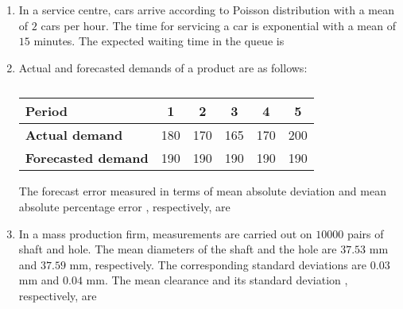 \documentclass[journal,12pt,onecolumn]{IEEEtran}
\theoremstyle{remark}
\begin{document}
\begin{enumerate}
\item In a service centre, cars arrive according to Poisson distribution with a mean of $2$ cars per hour. The time for servicing a car is exponential with a mean of $15$ minutes. The expected waiting time  in the queue is

\hfill{}

\begin{enumerate}
\end{enumerate}

\item Actual and forecasted demands of a product are as follows:
\begin{table}[h]
    \centering
    \caption*{}
    \label{tab:q32}
    \begin{tabular}{|l|c|c|c|c|c|}
    \hline
    \textbf{Period} & 1 & 2 & 3 & 4 & 5 \\
    \hline
    \textbf{Actual demand} & 180 & 170 & 165 & 170 & 200 \\
    \hline
    \textbf{Forecasted demand} & 190 & 190 & 190 & 190 & 190 \\
    \hline
    \end{tabular}
\end{table}
The forecast error measured in terms of mean absolute deviation  and mean absolute percentage error , respectively, are

\hfill{}

\begin{enumerate}
\end{enumerate}

\item In a mass production firm, measurements are carried out on $10000$ pairs of shaft and hole. The mean diameters of the shaft and the hole are $37.53$ mm and $37.59$ mm, respectively. The corresponding standard deviations are $0.03$ mm and $0.04$ mm. The mean clearance and its standard deviation , respectively, are


\end{enumerate}
\end{document}
